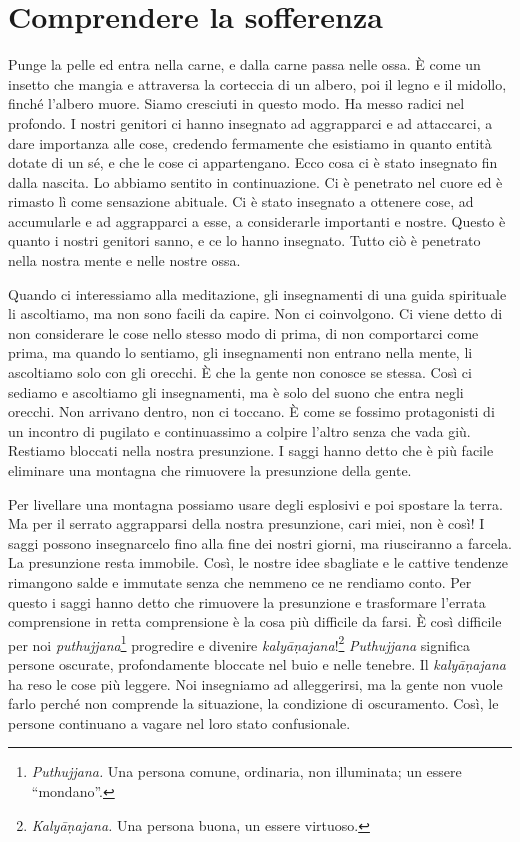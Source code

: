 \chapter{Comprendere la sofferenza}

Punge la pelle ed entra nella carne, e dalla carne passa nelle ossa. È
come un insetto che mangia e attraversa la corteccia di un albero, poi
il legno e il midollo, finché l'albero muore. Siamo cresciuti in questo
modo. Ha messo radici nel profondo. I nostri genitori ci hanno insegnato
ad aggrapparci e ad attaccarci, a dare importanza alle cose, credendo
fermamente che esistiamo in quanto entità dotate di un sé, e che le cose
ci appartengano. Ecco cosa ci è stato insegnato fin dalla nascita. Lo
abbiamo sentito in continuazione. Ci è penetrato nel cuore ed è rimasto
lì come sensazione abituale. Ci è stato insegnato a ottenere cose, ad
accumularle e ad aggrapparci a esse, a considerarle importanti e nostre.
Questo è quanto i nostri genitori sanno, e ce lo hanno insegnato. Tutto
ciò è penetrato nella nostra mente e nelle nostre ossa.

Quando ci interessiamo alla meditazione, gli insegnamenti di una guida
spirituale li ascoltiamo, ma non sono facili da capire. Non ci
coinvolgono. Ci viene detto di non considerare le cose nello stesso modo
di prima, di non comportarci come prima, ma quando lo sentiamo, gli
insegnamenti non entrano nella mente, li ascoltiamo solo con gli
orecchi. È che la gente non conosce se stessa. Così ci sediamo e
ascoltiamo gli insegnamenti, ma è solo del suono che entra negli
orecchi. Non arrivano dentro, non ci toccano. È come se fossimo
protagonisti di un incontro di pugilato e continuassimo a colpire
l'altro senza che vada giù. Restiamo bloccati nella nostra presunzione.
I saggi hanno detto che è più facile eliminare una montagna che
rimuovere la presunzione della gente.

Per livellare una montagna possiamo usare degli esplosivi e poi spostare
la terra. Ma per il serrato aggrapparsi della nostra presunzione, cari
miei, non è così! I saggi possono insegnarcelo fino alla fine dei nostri
giorni, ma riusciranno a farcela. La presunzione resta immobile. Così,
le nostre idee sbagliate e le cattive tendenze rimangono salde e
immutate senza che nemmeno ce ne rendiamo conto. Per questo i saggi
hanno detto che rimuovere la presunzione e trasformare l'errata
comprensione in retta comprensione è la cosa più difficile da farsi. È
così difficile per noi \emph{puthujjana}\footnote{\emph{Puthujjana.} Una
  persona comune, ordinaria, non illuminata; un essere ``mondano''.}
progredire e divenire \emph{kalyāṇajana}!\footnote{\emph{Kalyāṇajana.}
  Una persona buona, un essere virtuoso.} \emph{Puthujjana} significa
persone oscurate, profondamente bloccate nel buio e nelle tenebre. Il
\emph{kalyāṇajana} ha reso le cose più leggere. Noi insegniamo ad
alleggerirsi, ma la gente non vuole farlo perché non comprende la
situazione, la condizione di oscuramento. Così, le persone continuano a
vagare nel loro stato confusionale.

